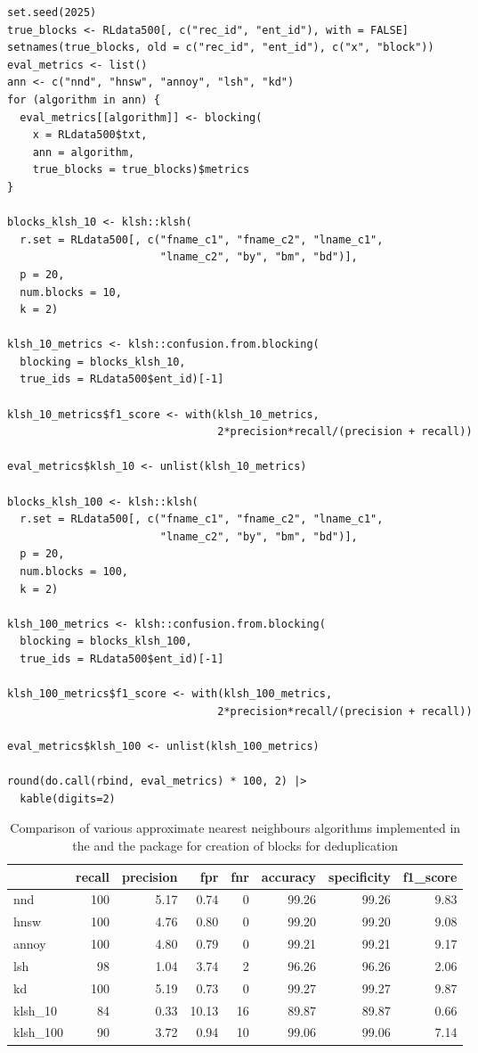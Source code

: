 \begin{verbatim}
set.seed(2025)
true_blocks <- RLdata500[, c("rec_id", "ent_id"), with = FALSE]
setnames(true_blocks, old = c("rec_id", "ent_id"), c("x", "block"))
eval_metrics <- list()
ann <- c("nnd", "hnsw", "annoy", "lsh", "kd")
for (algorithm in ann) {
  eval_metrics[[algorithm]] <- blocking(
    x = RLdata500$txt,
    ann = algorithm,
    true_blocks = true_blocks)$metrics
}

blocks_klsh_10 <- klsh::klsh(
  r.set = RLdata500[, c("fname_c1", "fname_c2", "lname_c1",
                        "lname_c2", "by", "bm", "bd")],
  p = 20,
  num.blocks = 10,
  k = 2)

klsh_10_metrics <- klsh::confusion.from.blocking(
  blocking = blocks_klsh_10,
  true_ids = RLdata500$ent_id)[-1]

klsh_10_metrics$f1_score <- with(klsh_10_metrics,
                                 2*precision*recall/(precision + recall))

eval_metrics$klsh_10 <- unlist(klsh_10_metrics)

blocks_klsh_100 <- klsh::klsh(
  r.set = RLdata500[, c("fname_c1", "fname_c2", "lname_c1",
                        "lname_c2", "by", "bm", "bd")],
  p = 20,
  num.blocks = 100,
  k = 2)

klsh_100_metrics <- klsh::confusion.from.blocking(
  blocking = blocks_klsh_100,
  true_ids = RLdata500$ent_id)[-1]

klsh_100_metrics$f1_score <- with(klsh_100_metrics,
                                 2*precision*recall/(precision + recall))

eval_metrics$klsh_100 <- unlist(klsh_100_metrics)

round(do.call(rbind, eval_metrics) * 100, 2) |>
  kable(digits=2)
\end{verbatim}

\begin{table}

\caption{\label{tab:comparision}Comparison of various approximate nearest neighbours algorithms implemented in the  and the  package for creation of blocks for deduplication}
\centering
\begin{tabular}[t]{l|r|r|r|r|r|r|r}
\hline
  & recall & precision & fpr & fnr & accuracy & specificity & f1\_score\\
\hline
nnd & 100 & 5.17 & 0.74 & 0 & 99.26 & 99.26 & 9.83\\
\hline
hnsw & 100 & 4.76 & 0.80 & 0 & 99.20 & 99.20 & 9.08\\
\hline
annoy & 100 & 4.80 & 0.79 & 0 & 99.21 & 99.21 & 9.17\\
\hline
lsh & 98 & 1.04 & 3.74 & 2 & 96.26 & 96.26 & 2.06\\
\hline
kd & 100 & 5.19 & 0.73 & 0 & 99.27 & 99.27 & 9.87\\
\hline
klsh\_10 & 84 & 0.33 & 10.13 & 16 & 89.87 & 89.87 & 0.66\\
\hline
klsh\_100 & 90 & 3.72 & 0.94 & 10 & 99.06 & 99.06 & 7.14\\
\hline
\end{tabular}
\end{table}

